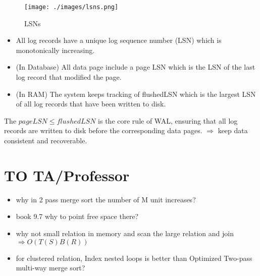 \documentclass[12pt,a4paper]{article}
\begin{document}
\begin{figure}[ht]
    \centering
    \texttt{[image: ./images/lsns.png]}
    \caption{LSNs}
\end{figure}

\begin{itemize}
    \item All log records have a unique log sequence number (LSN) which is monotonically increasing.
    \item (In Database) All data page include a page LSN which is the LSN of the last log record that modified the page.
    \item (In RAM) The system keeps tracking of flushedLSN which is the largest LSN of all log records that have been written to disk.
\end{itemize}

The \(pageLSN \leq flushedLSN\) is the core rule of WAL, ensuring that all log records are written to disk before the corresponding data pages.
$\Rightarrow$ keep data consistent and recoverable.

\section{}

\section*{TO TA/Professor}

\begin{itemize}
    \item why in 2 pass merge sort the number of M unit increases?
    \item book 9.7 why to point free space there?
    \item why not small relation in memory and scan the large relation and join $\Rightarrow O(T(S)B(R))$ 
    \item for clustered relation, Index nested loops is better than Optimized Two-pass multi-way merge sort?
\end{itemize}
\end{document}
